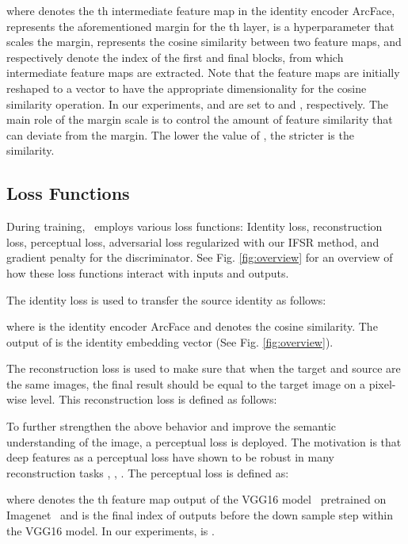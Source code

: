 \documentclass[10pt,twocolumn,letterpaper]{article}
\newcommand{\fti}[1]{\textit{FaceDancer}{#1}}
\begin{document}
where  denotes the  th intermediate feature map in the identity encoder ArcFace,  represents the aforementioned margin for the th layer,  is a hyperparameter that scales the margin,  represents the cosine similarity between two feature maps,  and  respectively denote the index of the first and final blocks, from which intermediate feature maps are extracted. Note that the feature maps are initially reshaped to a vector to have the appropriate dimensionality for the cosine similarity operation. In our experiments,  and  are set to   and , respectively. 
The main role of the margin scale  is to control the amount of feature similarity that can deviate from the margin.
The lower the value of , the stricter is the similarity.

\subsection{Loss Functions}
\label{sec:losses}
During training, \fti~employs various loss functions: Identity loss, reconstruction loss, perceptual loss, adversarial loss regularized with our IFSR method, and gradient penalty for the discriminator. 
See Fig. \ref{fig:overview} for an overview of how these loss functions interact with inputs and outputs.


The identity loss is used to transfer the source identity as follows:



where  is the identity encoder ArcFace and  denotes the cosine similarity. The output of  is the identity embedding vector   (See Fig. \ref{fig:overview}). 

The reconstruction loss is used to make sure that when the target  and source  are the same images, the final result  should be equal to the target image on a pixel-wise level. This reconstruction loss is  defined as follows:




To further strengthen the above behavior and improve the semantic understanding of the image, a perceptual loss is deployed.  The motivation  is that deep features as a perceptual loss have shown to be robust in many reconstruction tasks \cite{pix2pixhd}, \cite{perceptloss1}, \cite{perceptloss2}. The perceptual loss is defined as:



where  denotes the th feature map output of the VGG16 model~\cite{perceptloss1} pretrained on Imagenet~\cite{imagenet} and  is the final index of outputs before the down sample step within the VGG16 model. In our experiments,  is .
\end{document}
